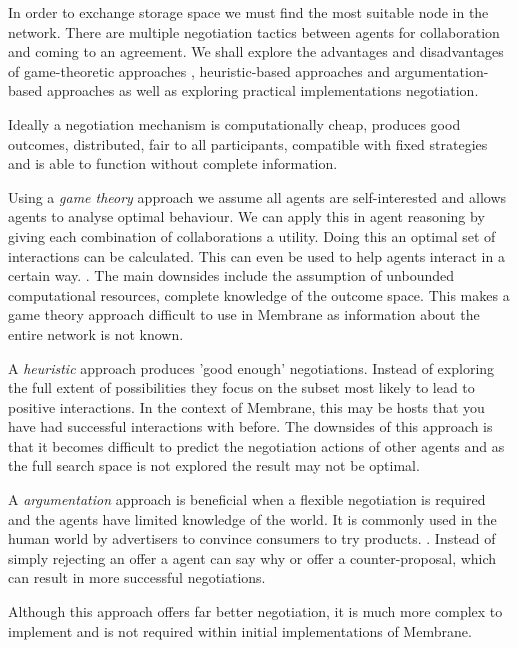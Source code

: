 \documentclass[11pt, a4paper, twoside]{report}
\begin{document}
In order to exchange storage space we must find the most suitable node in the network. There are multiple negotiation tactics between agents for collaboration and coming to an agreement. \citep{beer1999negotiation} We shall explore the advantages and disadvantages of game-theoretic approaches \citep*{rosenschein1994rules, kraus2001strategic, sandholm2002algorithm}, heuristic-based approaches \citep*{faratin2000automated, fatima2002multi} and argumentation-based approaches \citep*{kraus1998reaching, jennings1998argumentation} as well as exploring practical implementations negotiation.

Ideally a negotiation mechanism is computationally cheap, produces good outcomes, distributed, fair to all participants, compatible with fixed strategies and is able to function without complete information. \citep{rahwan2005interest}

Using a \emph{game theory} approach we assume all agents are self-interested and allows agents to analyse optimal behaviour. \citep{osborne1994course} We can apply this in agent reasoning by giving each combination of collaborations a utility. Doing this an optimal set of interactions can be calculated. This can even be used to help agents interact in a certain way. \citep{varian1995economic}. The main downsides include the assumption of unbounded computational resources, complete knowledge of the outcome space. \citep{rahwan2005interest} This makes a game theory approach difficult to use in Membrane as information about the entire network is not known.

A \emph{heuristic} approach produces 'good enough' negotiations. Instead of exploring the full extent of possibilities they focus on the subset most likely to lead to positive interactions. In the context of Membrane, this may be hosts that you have had successful interactions with before. The downsides of this approach is that it becomes difficult to predict the negotiation actions of other agents and as the full search space is not explored the result may not be optimal. \citep{jennings2001automated}

A \emph{argumentation} approach is beneficial when a flexible negotiation is required and the agents have limited knowledge of the world. It is commonly used in the human world by advertisers to convince consumers to try products. \citep{slade2002reasons}. Instead of simply rejecting an offer a agent can say why or offer a counter-proposal, which can result in more successful negotiations.

Although this approach offers far better negotiation, it is much more complex to implement and is not required within initial implementations of Membrane.
\end{document}
